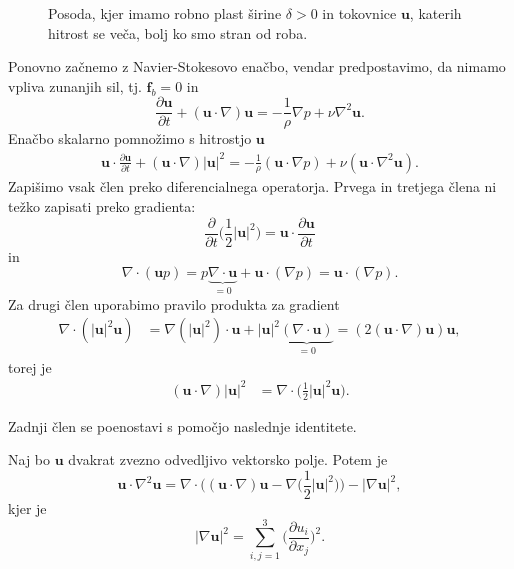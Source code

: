 \documentclass[mat2, tisk]{fmfdelo}
\newcommand{\bd}{\textbf}
\begin{document}
\begin{figure}[h!]
\caption{Posoda, kjer imamo robno plast širine $\delta>0$ in tokovnice $\bd{u}$, katerih hitrost se veča, bolj ko smo stran od roba.}
\end{figure}

Ponovno začnemo z Navier-Stokesovo enačbo, vendar predpostavimo, da nimamo vpliva zunanjih sil, tj. $\bd{f}_b = 0$ in
$$
\frac{\partial \bd{u}}{\partial t} + (\bd{u}\cdot \nabla)\bd{u} = - \frac{1}{\rho}\nabla p + \nu \nabla^2 \bd{u}.
$$
Enačbo skalarno pomnožimo s hitrostjo $\bd{u}$
\begin{align*}
\bd{u}\cdot\frac{\partial \bd{u}}{\partial t} + (\bd{u}\cdot \nabla)|\bd{u}|^2 = - \frac{1}{\rho}(\bd{u}\cdot\nabla p) + \nu (\bd{u}\cdot\nabla^2 \bd{u}).
\end{align*}
Zapišimo vsak člen preko diferencialnega operatorja. Prvega in tretjega člena ni težko zapisati preko gradienta:
$$
\frac{\partial}{\partial t} \Big(\frac{1}{2} \bd{|u|}^2 \Big) = \bd{u}\cdot \frac{\partial \bd{u}}{\partial t}
$$
in
$$
\nabla \cdot (\bd{u}p) = p\underbrace{\nabla\cdot \bd{u}}_{=0} + \bd{u}\cdot (\nabla p) = \bd{u}\cdot (\nabla p).
$$
Za drugi člen uporabimo pravilo produkta za gradient 
\begin{align*}
\nabla \cdot (|\bd{u}|^2 \bd{u}) &= \nabla(|\bd{u}|^2) \cdot \bd{u} + |\bd{u}|^2 \underbrace{(\nabla \cdot \bd{u})}_{= 0} =  (2(\bd{u}\cdot\nabla)\bd{u})\bd{u},
\end{align*}
torej je
\begin{align*}
(\bd{u}\cdot\nabla)|\bd{u}|^2 &= \nabla \cdot \Big(\frac{1}{2} |\bd{u}|^2 \bd{u}\Big).
\end{align*}

Zadnji člen se poenostavi s pomočjo naslednje identitete.
\begin{lema}
Naj bo $\bd{u}$ dvakrat zvezno odvedljivo vektorsko polje.
Potem je
\begin{equation*}
\bd{u}\cdot \nabla^2 \bd{u} = \nabla\cdot\Big((\bd{u}\cdot \nabla)\bd{u} - \nabla\Big(\frac{1}{2} |\bd{u}|^2\Big)\Big) - |\nabla \bd{u}|^2,
\end{equation*}
kjer je 
\begin{equation}
\label{gradnorm}
  |\nabla \bd{u}|^2 = \sum_{i,j=1}^3 \Big(\frac{\partial u_i}{\partial x_j}\Big)^2.
\end{equation}
\end{lema}
\end{document}
